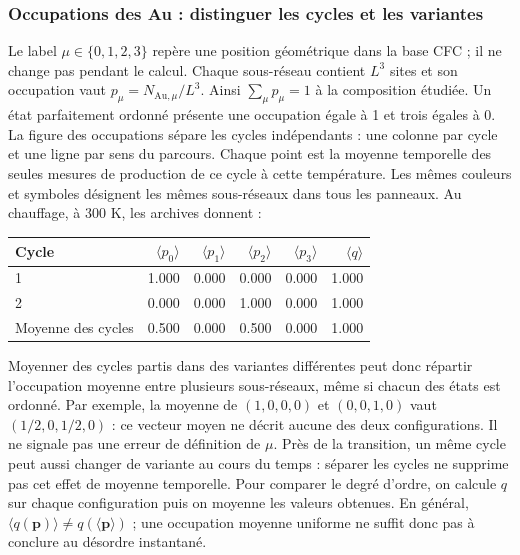 \subsubsection{Occupations des Au : distinguer les cycles et les variantes}
Le label $\mu\in\{0,1,2,3\}$ repère une position géométrique dans la base CFC ; il ne change pas pendant le calcul. Chaque sous-réseau contient $L^3$ sites et son occupation vaut $p_\mu=N_{\mathrm{Au},\mu}/L^3$. Ainsi $\sum_\mu p_\mu=1$ à la composition étudiée. Un état parfaitement ordonné présente une occupation égale à 1 et trois égales à 0.
La figure des occupations sépare les cycles indépendants : une colonne par cycle et une ligne par sens du parcours. Chaque point est la moyenne temporelle des seules mesures de production de ce cycle à cette température. Les mêmes couleurs et symboles désignent les mêmes sous-réseaux dans tous les panneaux.
Au chauffage, à $300$ K, les archives donnent :
\begin{center}\small\begin{tabular}{lrrrrr}\toprule
Cycle & $\langle p_0\rangle$ & $\langle p_1\rangle$ & $\langle p_2\rangle$ & $\langle p_3\rangle$ & $\langle q\rangle$\\\midrule
1 & 1.000 & 0.000 & 0.000 & 0.000 & 1.000\\
2 & 0.000 & 0.000 & 1.000 & 0.000 & 1.000\\
\midrule Moyenne des cycles & 0.500 & 0.000 & 0.500 & 0.000 & 1.000\\
\bottomrule\end{tabular}\end{center}
Moyenner des cycles partis dans des variantes différentes peut donc répartir l'occupation moyenne entre plusieurs sous-réseaux, même si chacun des états est ordonné. Par exemple, la moyenne de $(1,0,0,0)$ et $(0,0,1,0)$ vaut $(1/2,0,1/2,0)$ : ce vecteur moyen ne décrit aucune des deux configurations. Il ne signale pas une erreur de définition de $\mu$.
Près de la transition, un même cycle peut aussi changer de variante au cours du temps : séparer les cycles ne supprime pas cet effet de moyenne temporelle. Pour comparer le degré d'ordre, on calcule $q$ sur chaque configuration puis on moyenne les valeurs obtenues. En général, $\langle q(\mathbf p)\rangle\ne q(\langle\mathbf p\rangle)$ ; une occupation moyenne uniforme ne suffit donc pas à conclure au désordre instantané.
